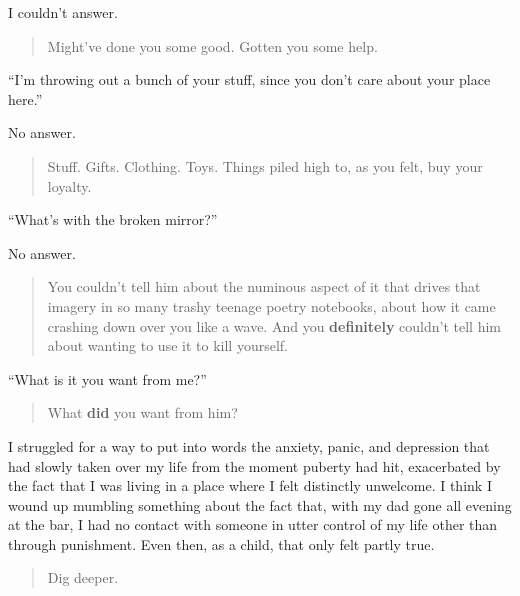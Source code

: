 I couldn't answer.

\begin{quote}
Might've done you some good. Gotten you some help.
\end{quote}

``I'm throwing out a bunch of your stuff, since you don't care about your place here.''

No answer.

\begin{quote}
Stuff. Gifts. Clothing. Toys. Things piled high to, as you felt, buy your loyalty.
\end{quote}

``What's with the broken mirror?''

No answer.

\begin{quote}
You couldn't tell him about the numinous aspect of it that drives that imagery in so many trashy teenage poetry notebooks, about how it came crashing down over you like a wave. And you \textbf{definitely} couldn't tell him about wanting to use it to kill yourself.
\end{quote}

``What is it you want from me?''

\begin{quote}
What \textbf{did} you want from him?
\end{quote}

I struggled for a way to put into words the anxiety, panic, and depression that had slowly taken over my life from the moment puberty had hit, exacerbated by the fact that I was living in a place where I felt distinctly unwelcome. I think I wound up mumbling something about the fact that, with my dad gone all evening at the bar, I had no contact with someone in utter control of my life other than through punishment. Even then, as a child, that only felt partly true.

\begin{quote}
Dig deeper.
\end{quote}
